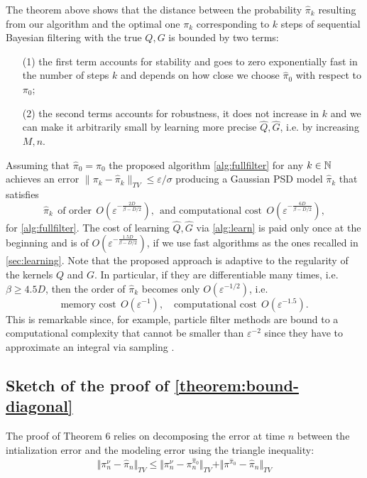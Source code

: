 The theorem above shows that the distance between the probability $\hat \pi_k$ resulting from our algorithm and the optimal one $\pi_k$ corresponding to $k$ steps of sequential Bayesian filtering with the true $Q, G$ is bounded by two terms:
\begin{enumerate}
\item[(1)] the first term accounts for stability and goes to zero exponentially fast in the number of steps $k$ and depends on how close we choose $\hat{\pi}_0$ with respect to $\pi_0$;
\item[(2)] the second terms accounts for robustness, it does not increase in $k$ and we can make it arbitrarily small by learning more precise $\hat{Q}, \hat{G}$, i.e. by increasing $M, n$.
\end{enumerate}

Assuming that $\hat{\pi}_0 = \pi_0$ the proposed algorithm \cref{alg:fullfilter} for any $k \in\mathbb N$ achieves an error $\|\pi_k - \hat{\pi}_k\|_{TV} \leq \varepsilon/\sigma$ producing a Gaussian PSD model $\hat{\pi}_k$ that satisfies
$$ \hat{\pi}_k ~~\textrm{of order}~~  O(\varepsilon^{-\frac{2D}{\beta - D/2}}), ~~\textrm{and computational cost} ~~ O(\varepsilon^{-\frac{6D}{\beta - D/2}}),$$
for \cref{alg:fullfilter}. The cost of learning $\hat{Q}, \hat{G}$ via \cref{alg:learn} is paid only once at the beginning and is of $O(\varepsilon^{-\frac{1.5D}{\beta - D/2}})$, if we use fast algorithms as the ones recalled in \cref{sec:learning}. Note that the proposed approach is adaptive to the regularity of the kernels $Q$ and $G$. In particular, if they are differentiable many times, i.e. $\beta \geq 4.5 D$, then the order of $\hat{\pi}_k$ becomes only  $O(\varepsilon^{-1/2})$, i.e.
$$
\textrm{memory cost} ~~ O(\varepsilon^{-1}), \quad \textrm{computational cost} ~~ O(\varepsilon^{-1.5}).
$$
%
This is remarkable since, for example, particle filter methods are bound to a computational complexity that cannot be smaller than $\varepsilon^{-2}$ since they have to approximate an integral via sampling \citep{oudjane}.

\subsection{Sketch of the proof of \cref{theorem:bound-diagonal}}\label{sec:sketches-filter}
The proof of Theorem 6 relies on decomposing the error at time $n$ between the intialization error and the modeling error using the triangle inequality:
\begin{equation*}
\Vert \pi^\nu_n - \hat\pi_n\Vert_{TV} \leq \Vert\pi^\nu_n - \pi^{\hat \pi_0}_n\Vert_{TV} + \Vert\pi^{\hat\pi_0} - \hat \pi_n\Vert_{TV}
\end{equation*}


